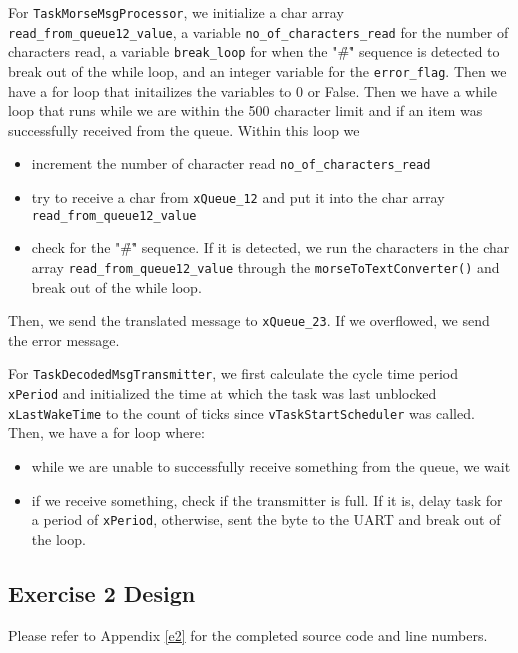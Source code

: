 \documentclass[11pt, letterpaper, titlepage]{article}
\begin{document}
For \texttt{TaskMorseMsgProcessor}, we initialize a char array \texttt{read_from_queue12_value}, a variable \texttt{no_of_characters_read} for the number of characters read, a variable \texttt{break_loop} for when the "\r\#\r" sequence is detected to break out of the while loop, and an integer variable for the \texttt{error_flag}. Then we have a for loop that initailizes the variables to 0 or False. Then we have a while loop that runs while we are within the 500 character limit and if an item was successfully received from the queue. Within this loop we 
\begin{itemize}
  \item increment the number of character read \texttt{no_of_characters_read}
  \item try to receive a char from \texttt{xQueue_12} and put it into the char array \texttt{read_from_queue12_value}
  \item check for the "\r\#\r" sequence. If it is detected, we run the characters in the char array \texttt{read_from_queue12_value} through the \texttt{morseToTextConverter()} and break out of the while loop.
\end{itemize}
Then, we send the translated message to \texttt{xQueue_23}. If we overflowed, we send the error message.

For \texttt{TaskDecodedMsgTransmitter}, we first calculate the cycle time period \texttt{xPeriod} and initialized the time at which the task was last unblocked \texttt{xLastWakeTime} to the count of ticks since \texttt{vTaskStartScheduler} was called. Then, we have a for loop where:
\begin{itemize}
  \item while we are unable to successfully receive something from the queue, we wait 
  \item if we receive something, check if the transmitter is full. If it is, delay task for a period of \texttt{xPeriod}, otherwise, sent the byte to the UART and break out of the loop.
\end{itemize}

\subsection{Exercise 2 Design}
Please refer to Appendix \ref{e2} for the completed source code and line numbers. 
\end{document}
